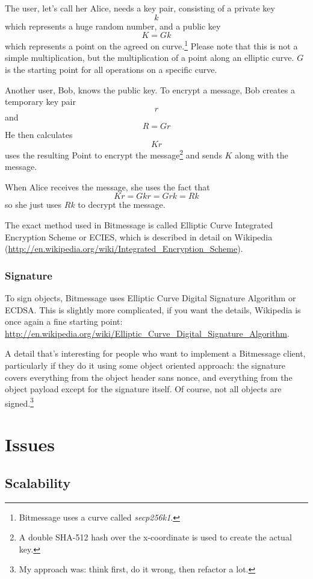 \documentclass{bfh}
\begin{document}
  The user, let's call her Alice, needs a key pair, consisting of a private key
$$k$$
which represents a huge random number, and a public key
$$K = G k$$
which represents a point on the agreed on curve.\footnote{Bitmessage uses a curve called \textit{secp256k1}.} Please note that this is not a simple multiplication, but the multiplication of a point along an elliptic curve. $G$ is the starting point for all operations on a specific curve.

  Another user, Bob, knows the public key. To encrypt a message, Bob creates a temporary key pair
$$r$$
and
$$R = G r$$
He then calculates
$$K r$$
uses the resulting Point to encrypt the message\footnote{A double SHA-512 hash over the x-coordinate is used to create the actual key.} and sends $K$ along with the message.

  When Alice receives the message, she uses the fact that
$$K r = G k r = G r k = R k$$
so she just uses $R k$ to decrypt the message.

  The exact method used in Bitmessage is called Elliptic Curve Integrated Encryption Scheme or ECIES, which is described in detail on Wikipedia (\url{http://en.wikipedia.org/wiki/Integrated_Encryption_Scheme}).

  \subsubsection{Signature}

  To sign objects, Bitmessage uses Elliptic Curve Digital Signature Algorithm or ECDSA. This is slightly more complicated, if you want the details, Wikipedia is once again a fine starting point: \url{http://en.wikipedia.org/wiki/Elliptic_Curve_Digital_Signature_Algorithm}.

  A detail that's interesting for people who want to implement a Bitmessage client, particularly if they do it using some object oriented approach: the signature covers everything from the object header sans nonce, and everything from the object payload except for the signature itself. Of course, not all objects are signed.\footnote{My approach was: think first, do it wrong, then refactor a lot.}

  \newpage
  \section{Issues}

  \subsection{Scalability}
\end{document}
